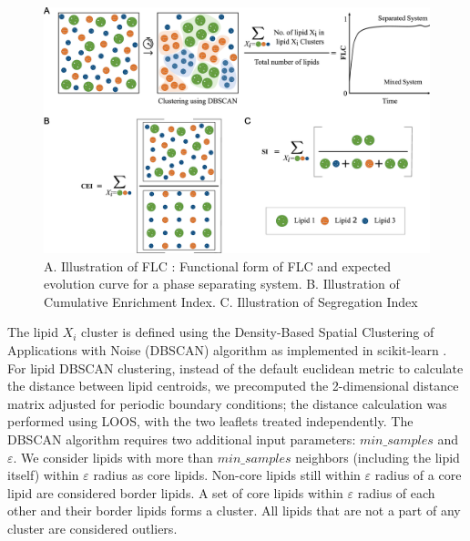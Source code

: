 \documentclass{biophys-new}
\begin{document}
\begin{figure}[hbt!]
\centering
\includegraphics[width=6.5in]{Figures/Main/2/placeholder.jpg}
\caption{A. Illustration of FLC :  Functional form of FLC and expected evolution curve for a phase separating system. B. Illustration of Cumulative Enrichment Index. C. Illustration of Segregation Index}
\label{fig2:view}
\end{figure}


The lipid $X_i$ cluster is defined using the Density-Based Spatial Clustering of Applications with Noise (DBSCAN) algorithm \cite{MartinEsterHans-PeterKriegelJiirgSander1996, Ester2017} as implemented in scikit-learn \cite{PedregosaF.VaroquauxG.GramfortA.MichelV.ThirionB.GriselO.BlondelM.PrettenhoferP.WeissR.andDubourgV.VanderplasJ.PassosA.CournapeauD.BrucherM.PerrotM.Duchesnay2011}.
For lipid DBSCAN clustering, instead of the default euclidean metric to calculate the distance between lipid centroids, we precomputed the 2-dimensional distance matrix adjusted for periodic boundary conditions; the distance calculation was performed using LOOS, with the two leaflets treated independently.
The DBSCAN algorithm requires two additional input parameters: $min\_samples$ and $\varepsilon$.
We consider lipids with more than $min\_samples$ neighbors (including the lipid itself) within $\varepsilon$ radius as core lipids.
Non-core lipids still within $\varepsilon$ radius of a core lipid are considered border lipids.
A set of core lipids within $\varepsilon$ radius of each other and their border lipids forms a cluster.
All lipids that are not a part of any cluster are considered outliers.
\end{document}

